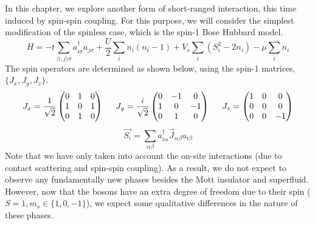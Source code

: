 In this chapter, we explore another form of short-ranged interaction, this time induced by spin-spin coupling. For this purpose, we will consider the simplest modification of the spinless case, which is the spin-1 Bose Hubbard model\cite{Tsuchiya_2004}. 
\begin{equation}
    H = -t\sum_{\langle i, j\rangle \sigma} a_{i\sigma}^{\dagger}a_{j\sigma} + \frac{U}{2}\sum_i n_i(n_i - 1) + V_s \sum_i (S_i^2 - 2n_i) - \mu \sum_i n_i
\end{equation}
The spin operators are determined as shown below, using the spin-1 matrices, $\{J_x, J_y, J_z\}$. 
\begin{equation}
    J_x = \frac{1}{\sqrt{2}}
    \begin{pmatrix}
    0 & 1 & 0 \\
    1 & 0 & 1 \\
    0 & 1 & 0
    \end{pmatrix}
    \hspace{0.5cm}
    J_y = \frac{i}{\sqrt{2}}\begin{pmatrix}
    0 & -1 & 0 \\
    1 & 0 & -1 \\
    0 & 1 & 0
    \end{pmatrix}
    \hspace{0.5cm}
    J_z = \begin{pmatrix}
    1 & 0 & 0 \\
    0 & 0 & 0 \\
    0 & 0 & -1
    \end{pmatrix}
\end{equation}
\begin{equation}
    \vec{S_i} = \sum_{\alpha \beta}a_{i\alpha}^{\dagger}\vec{J}_{\alpha \beta}a_{i\beta}
\end{equation}
Note that we have only taken into account the on-site interactions (due to contact scattering and spin-spin coupling). As a result, we do not expect to observe any fundamentally new phases besides the Mott insulator and superfluid. However, now that the bosons have an extra degree of freedom due to their spin ($S = 1, m_s \in \{1, 0, -1\}$), we expect some qualitative differences in the nature of these phases.

